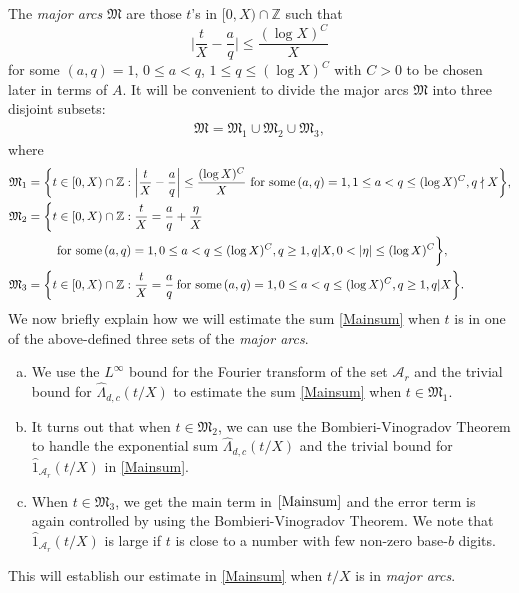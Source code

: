 \documentclass[12pt]{amsart}
\numberwithin{equation}{section}
\theoremstyle{remark}
\theoremstyle{definition}
\begin{document}
 The \emph{major arcs} $\mathfrak{M}$ are those $t$'s in $[0, X)\cap \mathbb{Z}$ such that 
\[\bigg|\dfrac{t}{X}-\dfrac{a}{q}\bigg|\leq \dfrac{(\log X)^C}{X}\]
for some $(a, q)=1$, $0\leq a<q$, $1\leq q\leq (\log X)^C$ with $C>0$ to be chosen later in terms of $A$. It will be convenient to divide the major arcs $\mathfrak{M}$ into three disjoint subsets:
\begin{align}
\label{maj}\mathfrak{M}=\mathfrak{M}_1\cup\mathfrak{M}_2\cup \mathfrak{M}_3,
\end{align}
where 
\begin{align}
\notag \mathfrak{M}_1 =\bigg\{t& \in [0, X)\cap \mathbb{Z}: \bigg\lvert\dfrac{t}{X}-\dfrac{a}{q}\bigg\rvert \leq \dfrac{(\log X)^C}{X}~\text{for some}\, (a, q)=1, 1\leq a <q\leq (\log X)^C, q\nmid X\bigg\},\\
\notag \mathfrak{M}_2=\bigg\{t& \in [0, X)\cap \mathbb{Z}: \dfrac{t}{X}=\dfrac{a}{q}+ \dfrac{\eta}{X}\\
\notag & \text{for some}\, (a, q)=1, 0\leq a< q\leq (\log X)^C, q\geq 1, q\vert X, 0<\lvert \eta \rvert \leq (\log X)^C\bigg\},\\
\notag \mathfrak{M}_3 =\bigg\{t& \in [0, X)\cap \mathbb{Z}: \dfrac{t}{X}=\dfrac{a}{q}\: \text{for some}\, (a, q)=1, 0\leq a< q\leq (\log X)^C, q\geq 1,  q\lvert X\bigg\}.
\end{align}
We now briefly explain how we will estimate the sum \eqref{Mainsum} when $t$ is in one of the above-defined three sets of the \emph{major arcs}.
\begin{enumerate}[(a)]
\item  We use the $L^\infty$ bound for the Fourier transform of the set $\mathcal{A}_r$ and the trivial bound for $\widehat{\Lambda}_{d,c}(t/X)$ to estimate the sum \eqref{Mainsum} when $t\in \mathfrak{M}_1$.
\item It turns out that when $t\in \mathfrak{M}_2$, we can use the Bombieri-Vinogradov Theorem to handle the exponential sum $\widehat{\Lambda}_{d,c}(t/X)$ and the trivial bound for $\widehat{1}_{\mathcal{A}_r}(t/X)$ in \eqref{Mainsum}. 
\item  When $t\in \mathfrak{M}_3$, we get the main term in $\eqref{Mainsum}$ and the error term is again controlled by using the Bombieri-Vinogradov Theorem.
We note that $\widehat{1}_{\mathcal{A}_r}(t/X)$ is large if $t$ is close to a number with few non-zero base-$b$ digits. 
\end{enumerate}
 
This will establish our estimate in \eqref{Mainsum} when $t/X$ is in \emph{major arcs}.
\end{document}
